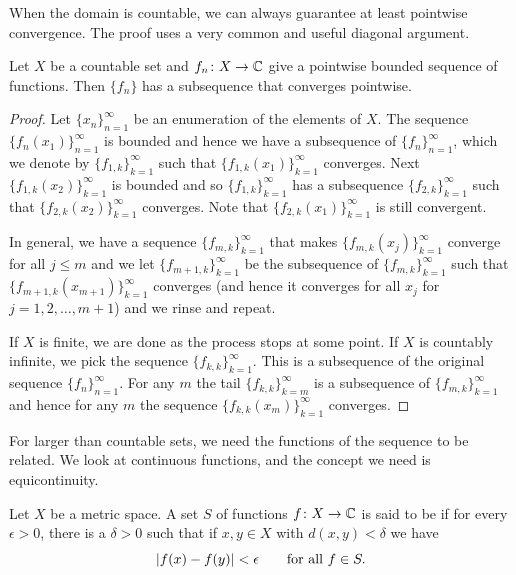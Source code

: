 When the domain is countable, we can always guarantee at least pointwise
convergence.
The proof uses a very common and useful diagonal argument.

\begin{prop} \label{prop:subsequenceoncountableX}
Let $X$ be a countable set and $f_n \colon X \to {\mathbb{C}}$ give a pointwise bounded
sequence of functions.  Then $\{ f_n \}$ has a subsequence that converges
pointwise.
\end{prop}

\begin{proof}
Let $\{ x_n \}_{n=1}^{\infty}$ be an enumeration of the elements of $X$.
The sequence $\{ f_n(x_1) \}_{n=1}^\infty$ is bounded and hence
we have a subsequence of $\{ f_n \}_{n=1}^{\infty}$, which we denote by
$\{ f_{1,k} \}_{k=1}^\infty$
such that
$\{ f_{1,k}(x_1) \}_{k=1}^\infty$ converges.
Next $\{ f_{1,k}(x_2) \}_{k=1}^\infty$ is bounded and so 
$\{ f_{1,k} \}_{k=1}^\infty$ has a subsequence
$\{ f_{2,k} \}_{k=1}^\infty$ such that
$\{ f_{2,k}(x_2) \}_{k=1}^\infty$ converges.  Note that
$\{ f_{2,k}(x_1) \}_{k=1}^\infty$ is still convergent.

In general, we have a sequence $\{ f_{m,k}
\}_{k=1}^\infty$
that makes $\{ f_{m,k}(x_j) \}_{k=1}^\infty$ converge for all $j \leq m$ and we 
let $\{ f_{m+1,k} \}_{k=1}^\infty$ be the subsequence of $\{ f_{m,k}
\}_{k=1}^\infty$
such that
$\{ f_{m+1,k}(x_{m+1}) \}_{k=1}^\infty$ converges (and hence it converges for all
$x_j$ for $j=1,2,\ldots,m+1$) and we rinse and repeat.

If $X$ is finite, we are done as the process stops at some point.
If $X$ is countably infinite,
we pick the sequence
$\{ f_{k,k} \}_{k=1}^\infty$.
This is a subsequence of the original sequence $\{ f_n \}_{n=1}^\infty$.
For any $m$ the tail $\{ f_{k,k} \}_{k=m}^\infty$ is a subsequence of $\{ f_{m,k}
\}_{k=1}^\infty$
and hence for any $m$ the sequence $\{ f_{k,k}(x_m) \}_{k=1}^\infty$ converges.
\end{proof}

For larger than countable sets,
we need the functions of the sequence to be related.  We look at
continuous functions, and the concept we need is equicontinuity.

\begin{defn}
Let $X$ be a metric space.
A set $S$ of functions
$f \colon X \to {\mathbb{C}}$ is said to be
\emph{}
if for every $\epsilon > 0$, there is a $\delta > 0$
such that if $x,y \in X$ with $d(x,y) < \delta$ we have
\begin{equation*}
\lvert {f(x)-f(y)} \rvert < \epsilon \qquad \text{for all } f \in S .
\end{equation*}
\end{defn}

